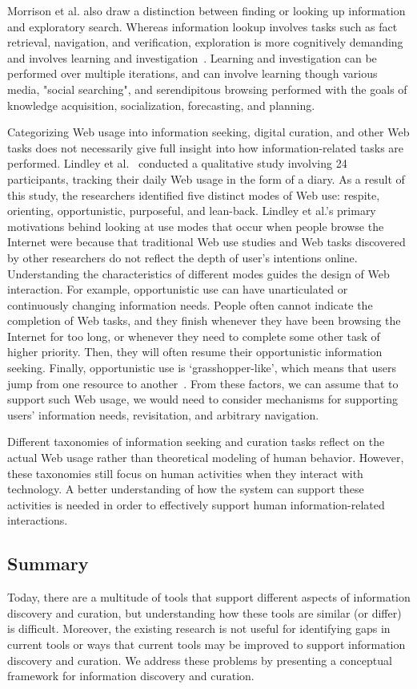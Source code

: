 \documentclass{sigchi}
\begin{document}
Morrison et al. also draw a distinction between finding or looking up information and exploratory search. Whereas information lookup involves tasks such as fact retrieval, navigation, and verification, exploration is more cognitively demanding and involves learning and investigation~\cite{marchionini2006exploratory}. Learning and investigation can be performed over multiple iterations, and can involve learning though various media, "social searching", and serendipitous browsing performed with the goals of knowledge acquisition, socialization, forecasting, and planning.  

Categorizing Web usage into information seeking, digital curation, and other Web tasks does not necessarily give full insight into how information-related tasks are performed. Lindley et al.~\cite{lindley2012s} conducted a qualitative study involving 24 participants, tracking their daily Web usage in the form of a diary. As a result of this study, the researchers identified five distinct modes of Web use: respite, orienting, opportunistic, purposeful, and lean-back. Lindley et al.'s primary motivations behind looking at use modes that occur when people browse the Internet were because that traditional Web use studies and Web tasks discovered by other researchers do not reflect the depth of user's intentions online. Understanding the characteristics of different modes guides the design of Web interaction. For example, opportunistic use can have unarticulated or continuously changing information needs. People often cannot indicate the completion of Web tasks, and they finish whenever they have been browsing the Internet for too long, or whenever they need to complete some other task of higher priority. Then, they will often resume their opportunistic information seeking. Finally, opportunistic use is `grasshopper-like', which means that users jump from one resource to another~\cite{lindley2012s}. From these factors, we can assume that to support such Web usage, we would need to consider mechanisms for supporting users' information needs, revisitation, and arbitrary navigation.

Different taxonomies of information seeking and curation tasks reflect on the actual Web usage rather than theoretical modeling of human behavior. However, these taxonomies still focus on human activities when they interact with technology. A better understanding of how the system can support these activities is needed in order to effectively support human information-related interactions. 

\subsection{Summary}
Today, there are a multitude of tools that support different aspects of information discovery and curation, but understanding how these tools are similar (or differ) is difficult. Moreover, the existing research is not useful for identifying gaps in current tools or ways that current tools may be improved to support information discovery and curation. We address these problems by presenting a conceptual framework for information discovery and curation.
\end{document}
